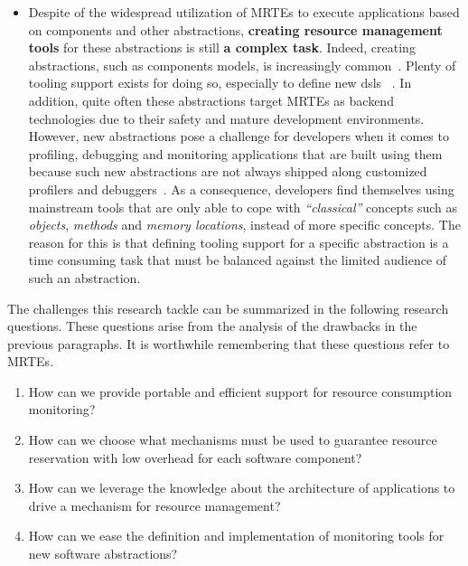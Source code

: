 \begin{itemize}
\item Despite of the widespread utilization of MRTEs to execute applications based on components and other abstractions, \textbf{creating resource management tools} for these abstractions is still \textbf{a complex task}.
Indeed, creating abstractions, such as components models, is increasingly common~\cite{van2000domain,hutchinson2011empirical,whittle2014state}.
Plenty of tooling support exists for doing so, especially to define new \glspl{dsl} ~\cite{van2000domain,Fowler:2010:DSL:1809745,raey,Merkle:2010:TMT:1869542.1869564,Eysholdt:2010:XIY:1869542.1869625}.
In addition, quite often these abstractions target MRTEs as backend technologies due to their safety and mature development environments.
However, new abstractions pose a challenge for developers when it comes to profiling, debugging and monitoring applications that are built using them because such new abstractions are not always shipped along customized profilers and debuggers~\cite{Kolomvatsos:2012:DAC:2148250.2148478,Wu:2008:GGD:1394966.1394970,Mannadiar:2010:DDM:1964571.1964595,Lindeman:2011:DDD:2047862.2047885,Wu:2005:TDL:1094855.1094920,Faith1998}.
As a consequence, developers find themselves using mainstream tools that are only able to cope with \textit{``classical''} concepts such as \textit{objects}, \textit{methods} and \textit{memory locations}, instead of more specific concepts.
The reason for this is that defining tooling support for a specific abstraction is a time consuming task that must be balanced against the limited audience of such an abstraction.
\end{itemize}
 
The challenges this research tackle can be summarized in the following research questions.
These questions arise from the analysis of the drawbacks in the previous paragraphs.
It is worthwhile remembering that these questions refer to MRTEs.

\begin{enumerate}
\renewcommand{\theenumi}{\textit{RQ\arabic{enumi}}}

\item How can we provide portable and efficient support for resource consumption monitoring? \label{rq:rq1}

\item How can we choose what mechanisms must be used to guarantee resource reservation with low overhead for each software component? \label{rq:rq2}

\item How can we leverage the knowledge about the architecture of applications to drive a mechanism for resource management? \label{rq:rq3}

\item How can we ease the definition and implementation of monitoring tools for new software abstractions? \label{rq:rq4}
\end{enumerate}
 
